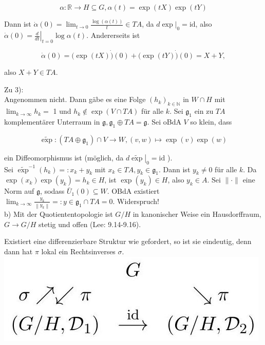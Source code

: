 \documentclass[10pt, letterpaper]{article}
\begin{document}
$$
\alpha: \mathbb{R} \rightarrow H \subseteq G, \alpha(t)=\exp (t X) \exp (t Y)
$$

Dann ist $\dot{\alpha}(0)=\lim _{t \rightarrow 0} \frac{\log (\alpha(t))}{t} \in T A$, da $\left.d \exp \right|_{0}=\mathrm{id}$, also $\dot{\alpha}(0)=\left.\frac{d}{d t}\right|_{t=0} \log \alpha(t)$. Andererseits ist

$$
\dot{\alpha}(0)=(\exp (t X) \dot{)}(0)+(\exp (t Y) \dot{)}(0)=X+Y,
$$

also $X+Y \in T A$.

Zu 3):\\
Angenommen nicht. Dann gäbe es eine Folge $\left(h_{k}\right)_{k \in \mathbb{N}}$ in $W \cap H$ mit $\lim _{k \rightarrow \infty} h_{k}=$ 1 und $h_{k} \notin \exp (V \cap T A)$ für alle $k$. Sei $\mathfrak{g}_{1}$ ein zu $T A$ komplementärer Unterraum in $\mathfrak{g}, \mathfrak{g}_{1} \oplus T A=\mathfrak{g}$. Sei oBdA $V$ so klein, dass

$$
\widetilde{\exp }:\left(T A \oplus \mathfrak{g}_{1}\right) \cap V \rightarrow W,(v, w) \mapsto \exp (v) \exp (w)
$$

ein Diffeomorphismus ist (möglich, da $\left.d \widetilde{\exp }\right|_{0}=\mathrm{id}$ ).\\
Sei $\widetilde{\exp }^{-1}\left(h_{k}\right)=: x_{k}+y_{k}$ mit $x_{k} \in T A, y_{k} \in \mathfrak{g}_{1}$. Dann ist $y_{k} \neq 0$ für alle $k$. Da $\exp \left(x_{k}\right) \exp \left(y_{k}\right)=h_{k} \in H$, ist $\exp \left(y_{k}\right) \in H$, also $y_{k} \in A$. Sei $\|\cdot\|$ eine Norm auf $\mathfrak{g}$, sodass $\bar{U}_{1}(0) \subseteq W$. OBdA existiert $\lim _{k \rightarrow \infty} \frac{y_{k}}{\left\|y_{k}\right\|}=: y \in \mathfrak{g}_{1} \cap T A=0$. Widerspruch!\\
b) Mit der Quotiententopologie ist $G / H$ in kanonischer Weise ein Hausdorffraum, $G \rightarrow G / H$ stetig und offen (Lee: 9.14-9.16).

Existiert eine differenzierbare Struktur wie gefordert, so ist sie eindeutig, denn dann hat $\pi$ lokal ein Rechtsinverses $\sigma$.\\
\includegraphics[max width=\textwidth, center]{2025_05_20_67e75debbfd3ba8ea587g-44}
\end{document}
